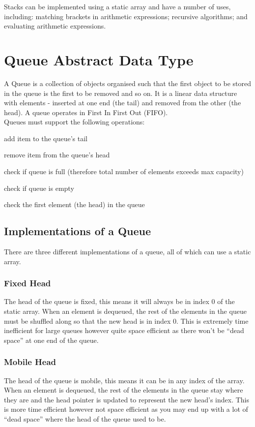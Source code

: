 Stacks can be implemented using a static array and have a number of uses, including: matching brackets in arithmetic expressions; recursive algorithms; and evaluating arithmetic expressions.

\section{Queue Abstract Data Type}
A Queue is a collection of objects organised such that the first object to be stored in the queue is the first to be removed and so on. It is a linear data structure with elements - inserted at one end (the tail) and removed from the other (the head). A queue operates in First In First Out (FIFO).\\

Queues must support the following operations:
\begin{description}[font=\ttfamily]
    \item[enqueue] add item to the queue's tail
    \item[dequeue] remove item from the queue's head
    \item[full] check if queue is full (therefore total number of elements exceeds max capacity)
    \item[empty] check if queue is empty
    \item[first] check the first element (the head) in the queue
\end{description}

\subsection{Implementations of a Queue}
There are three different implementations of a queue, all of which can use a static array.
\subsubsection{Fixed Head}
The head of the queue is fixed, this means it will always be in index 0 of the static array. When an element is dequeued, the rest of the elements in the queue must be shuffled along so that the new head is in index 0. This is extremely time inefficient for large queues however quite space efficient as there won't be ``dead space'' at one end of the queue.
\subsubsection{Mobile Head}
The head of the queue is mobile, this means it can be in any index of the array. When an element is dequeued, the rest of the elements in the queue stay where they are and the head pointer is updated to represent the new head's index. This is more time efficient however not space efficient as you may end up with a lot of ``dead space'' where the head of the queue used to be.
